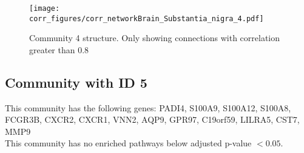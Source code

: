 \begin{figure}[h!]
\centering
\texttt{[image: corr\_figures/corr\_networkBrain\_Substantia\_nigra\_4.pdf]}
\caption{Community 4 structure. Only showing connections with correlation greater than 0.8}
\end{figure}




\subsection*{Community with ID 5}
This community has the following genes: PADI4, S100A9, S100A12, S100A8, FCGR3B, CXCR2, CXCR1, VNN2, AQP9, GPR97, C19orf59, LILRA5, CST7, MMP9
\\
This community has no enriched pathways below adjusted p-value $< 0.05$.

